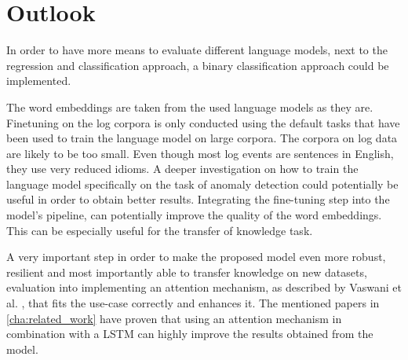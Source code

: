 
\section{Outlook\label{sec:outlook}}
In order to have more means to evaluate different language models, next to the regression and classification approach, a binary classification approach could be implemented.

The word embeddings are taken from the used language models as they are. Finetuning on the log corpora is only conducted using the default tasks that have been used to train the language model on large corpora. The corpora on log data are likely to be too small. Even though most log events are sentences in English, they use very reduced idioms. A deeper investigation on how to train the language model specifically on the task of anomaly detection could potentially be useful in order to obtain better results. Integrating the fine-tuning step into the model's pipeline, can potentially improve the quality of the word embeddings. This can be especially useful for the transfer of knowledge task.

A very important step in order to make the proposed model even more robust, resilient and most importantly able to transfer knowledge on new datasets, evaluation into implementing an attention mechanism, as described by Vaswani et al. \cite{vaswani2017attention}, that fits the use-case correctly and enhances it. The mentioned papers in \ref{cha:related_work} have proven that using an attention mechanism in combination with a LSTM can highly improve the results obtained from the model.


